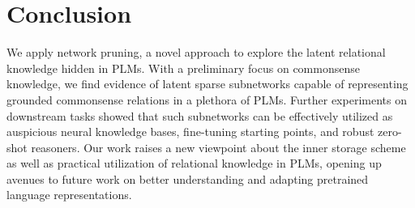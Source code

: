 \section{Conclusion}
We apply network pruning, a novel approach to explore the latent 
relational knowledge hidden in PLMs. With a preliminary focus on  
commonsense knowledge, we find evidence of latent sparse subnetworks 
capable of representing grounded commonsense relations in a 
plethora of PLMs. Further experiments on downstream tasks showed 
that such subnetworks can be effectively utilized as auspicious neural knowledge bases, fine-tuning 
starting points, and robust zero-shot reasoners. Our work raises a new viewpoint 
about the inner storage scheme as well as practical utilization of relational knowledge in PLMs, opening up avenues to future work on better understanding and adapting pretrained language representations.
%
%



